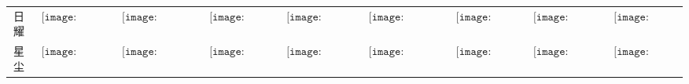 \begin{longtable}{|c|cccccccc|}
日耀&$\begin{array}{c}\texttt{[image: figures/Solar\_Candle.png]}\end{array}$&$\begin{array}{c}\texttt{[image: figures/Solar\_Candelabra.png]}\end{array}$&$\begin{array}{c}\texttt{[image: figures/Solar\_Lamp.png]}\end{array}$&$\begin{array}{c}\texttt{[image: figures/Solar\_Lantern.png]}\end{array}$&$\begin{array}{c}\texttt{[image: figures/Solar\_Chandelier.png]}\end{array}$&$\begin{array}{c}\texttt{[image: figures/Solar\_Door.png]}\end{array}$&$\begin{array}{c}\texttt{[image: figures/Solar\_Toilet.png]}\end{array}$&$\begin{array}{c}\texttt{[image: figures/Solar\_Chest.png]}\end{array}$\\
星尘&$\begin{array}{c}\texttt{[image: figures/Stardust\_Candle.png]}\end{array}$&$\begin{array}{c}\texttt{[image: figures/Stardust\_Candelabra.png]}\end{array}$&$\begin{array}{c}\texttt{[image: figures/Stardust\_Lamp.png]}\end{array}$&$\begin{array}{c}\texttt{[image: figures/Stardust\_Lantern.png]}\end{array}$&$\begin{array}{c}\texttt{[image: figures/Stardust\_Chandelier.png]}\end{array}$&$\begin{array}{c}\texttt{[image: figures/Stardust\_Door.png]}\end{array}$&$\begin{array}{c}\texttt{[image: figures/Stardust\_Toilet.png]}\end{array}$&$\begin{array}{c}\texttt{[image: figures/Stardust\_Chest.png]}\end{array}$\\

\end{longtable}
